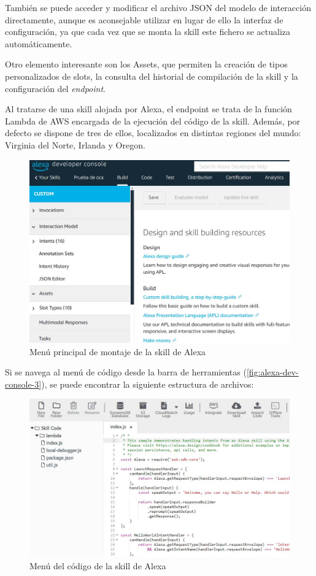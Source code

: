 También se puede acceder y modificar el archivo JSON del modelo de interacción directamente, aunque es aconsejable utilizar en lugar de ello la interfaz de configuración, ya que cada vez que se monta la skill este fichero se actualiza automáticamente.

Otro elemento interesante son los Assets, que permiten la creación de tipos personalizados de slots, la consulta del historial de compilación de la skill y la configuración del \textit{endpoint}. 

Al tratarse de una skill alojada por Alexa, el endpoint se trata de la función Lambda de AWS encargada de la ejecución del código de la skill. Además, por defecto se dispone de tres de ellos, localizados en distintas regiones del mundo: Virginia del Norte, Irlanda y Oregon.

\begin{figure}[H]
	\centering
	\includegraphics[width=1\textwidth]{imgs/alexa-dev-console-1.jpg}
	\caption{Menú principal de montaje de la skill de Alexa}
	\label{fig:alexa-dev-console-1}
\end{figure}

Si se navega al menú de código desde la barra de herramientas (\autoref{fig:alexa-dev-console-3}), se puede encontrar la siguiente estructura de archivos:

\begin{figure}[H]
	\centering
	\includegraphics[width=1\textwidth]{imgs/alexa-dev-console-3.jpg}
	\caption{Menú del código de la skill de Alexa}
	\label{fig:alexa-dev-console-3}
\end{figure}

